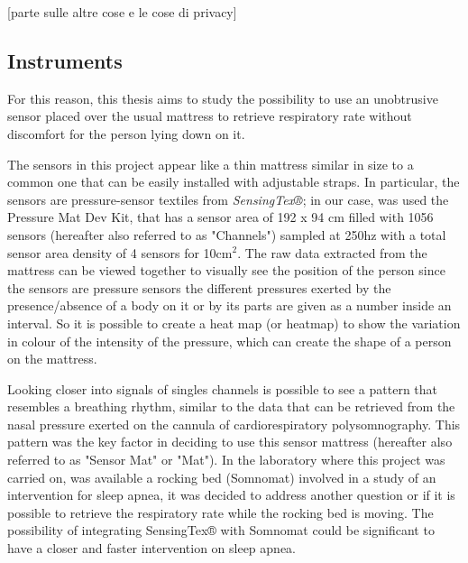 \documentclass[a4paper,11pt, oneside,italian]{article}
\begin{document}
[parte sulle altre cose e le cose di privacy]


\subsection*{Instruments}
For this reason, this thesis aims to study the possibility to use an unobtrusive sensor placed over the usual mattress to retrieve 
respiratory rate without discomfort for the person lying down on it. 


The sensors in this project appear like a thin mattress similar in size to a common one that can be easily installed with adjustable straps.
In particular, the sensors are pressure-sensor textiles from \textit{SensingTex®}; in our case, was used the Pressure Mat Dev Kit,
 that has a sensor area of 192 x 94 cm filled with 1056 sensors (hereafter also referred to as "Channels") sampled at 250hz
 with a total sensor area density of 4 sensors for 10cm$^2$.
 The raw data extracted from the mattress can be viewed together to visually see the position of the person since the sensors are pressure sensors
the different pressures exerted by the presence/absence of a body on it or by its parts are given as a number inside an interval. 
So it is possible to create a heat map (or heatmap) to show the variation in colour of the intensity of the pressure, which can create the shape of
a person on the mattress.

Looking closer into signals of singles channels is possible to see a pattern that resembles a breathing rhythm,  similar to the data that can
 be retrieved from the nasal pressure exerted on the cannula of cardiorespiratory polysomnography.
This pattern was the key factor in deciding to use this sensor mattress (hereafter also referred to as "Sensor Mat" or "Mat"). 
In the laboratory where this project was carried on, was available a rocking bed (Somnomat) involved in a study of an intervention for 
sleep apnea, it was decided to address another question or if it is possible to retrieve the respiratory rate while the rocking bed is moving.
The possibility of integrating SensingTex® with Somnomat could be significant to have a closer and faster intervention on sleep apnea.
\end{document}
